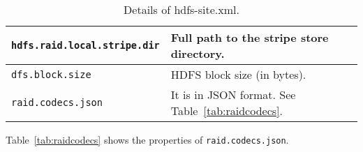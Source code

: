 \documentclass[letterpaper,12pt]{article}
\begin{document}
\begin{itemize}
\begin{table}[!ht]
\begin{tabular}{|p{2.5in}|p{3in}|}
\hline
{\tt hdfs.raid.local.stripe.dir} & Full path to the stripe store directory.\\
\hline
{\tt dfs.block.size} & HDFS block size (in bytes).\\
\hline
{\tt raid.codecs.json} & It is in JSON format. See Table~\ref{tab:raidcodecs}.\\
\hline
\end{tabular}
\caption{Details of hdfs-site.xml.}
\label{tab:hdfssite}
\end{table}

Table~\ref{tab:raidcodecs} shows the properties of {\tt raid.codecs.json}.



\end{itemize}
\end{document}
